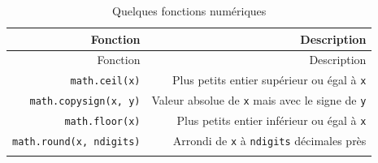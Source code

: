 \documentclass[12pt,]{book}
\numberwithin{equation}{section}
\numberwithin{countremarque}{section}
\begin{document}
\begin{longtable}[]{@{}rr@{}}
\caption{Quelques fonctions numériques}\tabularnewline
\toprule
\begin{minipage}[b]{0.21\columnwidth}\raggedleft\strut
Fonction\strut
\end{minipage} & \begin{minipage}[b]{0.60\columnwidth}\raggedleft\strut
Description\strut
\end{minipage}\tabularnewline
\midrule
\endfirsthead
\toprule
\begin{minipage}[b]{0.21\columnwidth}\raggedleft\strut
Fonction\strut
\end{minipage} & \begin{minipage}[b]{0.60\columnwidth}\raggedleft\strut
Description\strut
\end{minipage}\tabularnewline
\midrule
\endhead
\begin{minipage}[t]{0.21\columnwidth}\raggedleft\strut
\texttt{math.ceil(x)}\strut
\end{minipage} & \begin{minipage}[t]{0.60\columnwidth}\raggedleft\strut
Plus petits entier supérieur ou égal à \texttt{x}\strut
\end{minipage}\tabularnewline
\begin{minipage}[t]{0.21\columnwidth}\raggedleft\strut
\texttt{math.copysign(x,\ y)}\strut
\end{minipage} & \begin{minipage}[t]{0.60\columnwidth}\raggedleft\strut
Valeur absolue de \texttt{x} mais avec le signe de \texttt{y}\strut
\end{minipage}\tabularnewline
\begin{minipage}[t]{0.21\columnwidth}\raggedleft\strut
\texttt{math.floor(x)}\strut
\end{minipage} & \begin{minipage}[t]{0.60\columnwidth}\raggedleft\strut
Plus petits entier inférieur ou égal à \texttt{x}\strut
\end{minipage}\tabularnewline
\begin{minipage}[t]{0.21\columnwidth}\raggedleft\strut
\texttt{math.round(x,\ ndigits)}\strut
\end{minipage} & \begin{minipage}[t]{0.60\columnwidth}\raggedleft\strut
Arrondi de \texttt{x} à \texttt{ndigits} décimales près\strut
\end{minipage}\tabularnewline
\begin{minipage}[t]{0.21\columnwidth}\raggedleft\strut

\end{minipage}
\end{longtable}
\end{document}
